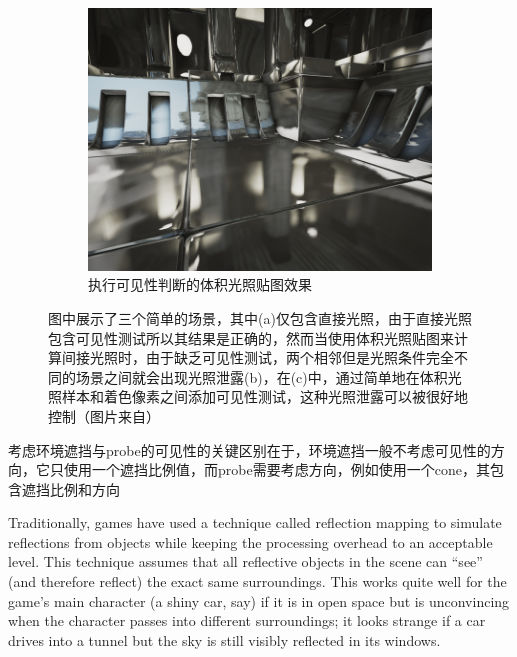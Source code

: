 \begin{figure}
\begin{fullwidth}
\begin{subfigure}[b]{0.33\thewidth}
		\includegraphics[width=\textwidth]{figures/pl/reflection-3}
			\caption{执行可见性判断的体积光照贴图效果}
	\end{subfigure}
	\caption{图中展示了三个简单的场景，其中(a)仅包含直接光照，由于直接光照包含可见性测试所以其结果是正确的，然而当使用体积光照贴图来计算间接光照时，由于缺乏可见性测试，两个相邻但是光照条件完全不同的场景之间就会出现光照泄露(b)，在(c)中，通过简单地在体积光照样本和着色像素之间添加可见性测试，这种光照泄露可以被很好地控制（图片来自\cite{a:Lightprobeinterpolationusingtetrahedraltessellations}）}
	\label{f:pl-reconstruction-comparation}
\end{fullwidth}
\end{figure}




考虑环境遮挡与probe的可见性的关键区别在于，环境遮挡一般不考虑可见性的方向，它只使用一个遮挡比例值，而probe需要考虑方向，例如使用一个cone，其包含遮挡比例和方向





Traditionally, games have used a technique called reflection mapping to simulate reflections from objects while keeping the processing overhead to an acceptable level. This technique assumes that all reflective objects in the scene can “see” (and therefore reflect) the exact same surroundings. This works quite well for the game’s main character (a shiny car, say) if it is in open space but is unconvincing when the character passes into different surroundings; it looks strange if a car drives into a tunnel but the sky is still visibly reflected in its windows.

